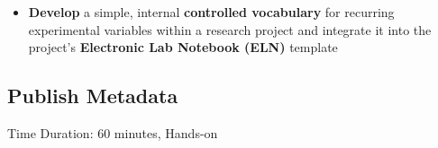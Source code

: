 \documentclass[11pt]{tibop-article}
\begin{document}
\begin{itemize}
    \item \textbf{Develop} a simple, internal \textbf{controlled vocabulary} for recurring experimental variables within a research project and integrate it into the project's \textbf{Electronic Lab Notebook (ELN)} template
\end{itemize}

\subsection{Publish Metadata}
Time Duration: 60 minutes, Hands-on
\end{document}

